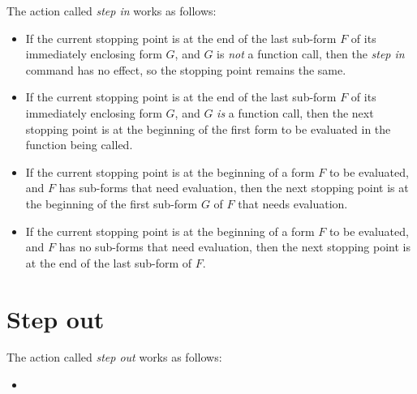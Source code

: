 The action called \emph{step in} works as follows:

\begin{itemize}
\item If the current stopping point is at the end of the last sub-form
  $F$ of its immediately enclosing form $G$, and $G$ is \emph{not} a
  function call, then the \emph{step in} command has no effect, so the
  stopping point remains the same.
\item If the current stopping point is at the end of the last sub-form
  $F$ of its immediately enclosing form $G$, and $G$ \emph{is} a
  function call, then the next stopping point is at the beginning of
  the first form to be evaluated in the function being called.
\item If the current stopping point is at the beginning of a form $F$
  to be evaluated, and $F$ has sub-forms that need evaluation, then
  the next stopping point is at the beginning of the first sub-form
  $G$ of $F$ that needs evaluation.
\item If the current stopping point is at the beginning of a form $F$
  to be evaluated, and $F$ has no sub-forms that need evaluation, then
  the next stopping point is at the end of the last sub-form of $F$.
\end{itemize}

\section{Step out}

The action called \emph{step out} works as follows:

\begin{itemize}
\item 
\end{itemize}

